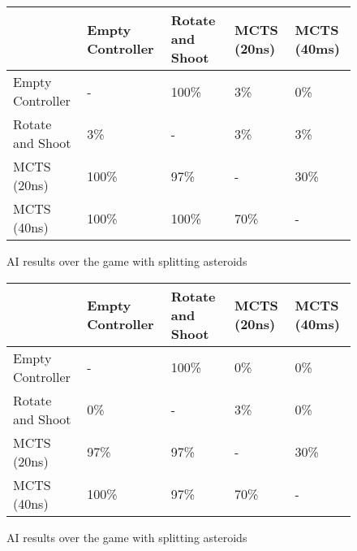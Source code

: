 \begin{figure}
	\caption{AI results over the game with splitting asteroids}
	\begin{tabular}{p{7.5em} | p{4.5em} p{4.5em} p{4.5em} p{4.5em}}
		&
			Empty Controller &
			Rotate and Shoot &
			MCTS (20ns) &
			MCTS (40ms) \\ \hline
		Empty Controller &
			-&
			100\% &
			3\% &
			0\% \\
		Rotate and Shoot &
			3\% &
			-&
			3\% &
			3\% \\ 
		MCTS (20ns) &
			100\% &
			97\% &
			-&
			30\% \\
		MCTS (40ns) &
			100\% &
			100\% &
			70\% &
			-\\
	\end{tabular}
\end{figure}

\begin{figure}
	\caption{AI results over the game with splitting asteroids}
	\begin{tabular}{p{7.5em} | p{4.5em} p{4.5em} p{4.5em} p{4.5em}}
		&
			Empty Controller &
			Rotate and Shoot &
			MCTS (20ns) &
			MCTS (40ms) \\ \hline
		Empty Controller &
			-&
			100\% &
			0\% &	
			0\% \\
		Rotate and Shoot &
			0\% &
			-&
			3\% &
			0\% \\ 
		MCTS (20ns) &
			97\% &
			97\% &
			-&
			30\% \\
		MCTS (40ns) &
			100\% &
			97\% &
			70\% &
			-\\
	\end{tabular}
\end{figure}
